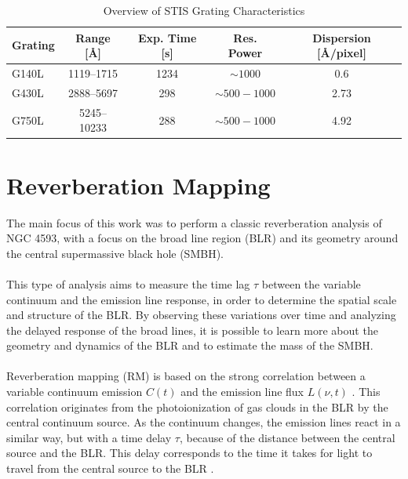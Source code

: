 \begin{table}[h!]
	\centering
	\small
	\caption{Overview of STIS Grating Characteristics \parencite{stisgratings}}
	\label{tab:stis_gratings}
	\begin{tabular}{lcccc}
		\hline
		\textbf{Grating} & \textbf{Range [\AA]} & \textbf{Exp. Time [s]} & \textbf{Res. Power} & \textbf{Dispersion [\AA/pixel]} \\
		\hline
		G140L  & 1119--1715  & 1234 & $\sim 1000$         & 0.6 \\
		G430L  & 2888--5697  & 298  & $\sim 500 - 1000$    & 2.73 \\
		G750L  & 5245--10233 & 288  & $\sim 500 - 1000$    & 4.92 \\
		\hline
	\end{tabular}
\end{table}

\section{Reverberation Mapping}



The main focus of this work was to perform a classic reverberation analysis of NGC 4593, with a focus on the broad line region (BLR) and its geometry around the central supermassive black hole (SMBH).\\\\
This type of analysis aims to measure the time lag $\tau$ between the variable continuum and the emission line response, in order to determine the spatial scale and structure of the BLR. By observing these variations over time and analyzing the delayed response of the broad lines, it is possible to learn more about the geometry and dynamics of the BLR and to estimate the mass of the SMBH.\\\\
Reverberation mapping (RM) is based on the strong correlation between a variable continuum emission $C(t)$ and the emission line flux $L(\nu, t)$ \parencite{horne2021space}. This correlation originates from the photoionization of gas clouds in the BLR by the central continuum source. As the continuum changes, the emission lines react in a similar way, but with a time delay $\tau$, because of the distance between the central source and the BLR. This delay corresponds to the time it takes for light to travel from the central source to the BLR \parencite{peterson1997introduction}.\\\\
